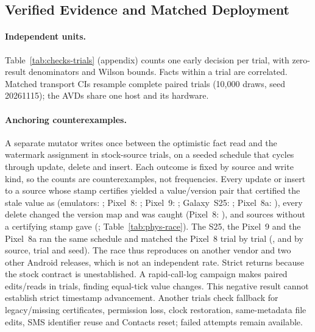 \subsection{Verified Evidence and Matched Deployment}
\label{sec:checks}

\paragraph{Independent units.} Table~\ref{tab:checks-trials} (appendix) counts one early decision per trial, with zero-result denominators and Wilson bounds. Facts within a trial are correlated. Matched transport CIs resample complete paired trials (10,000 draws, seed 20261115); the AVDs share one host and its hardware.

\paragraph{Anchoring counterexamples.} A separate mutator writes once between the optimistic fact read and the watermark assignment in \RevStock stock-source trials, on a seeded schedule that cycles through update, delete and insert. Each outcome is fixed by source and write kind, so the counts are counterexamples, not frequencies. Every update or insert to a source whose stamp certifies yielded a value/version pair that certified the stale value as \Fresh (emulators: \PhysRaceEmuStampedStale; Pixel~8: \PhysRaceStampedStale\ifPhysNine; Pixel~9: \PhysNineRaceStampedStale\fi\ifPhysSamsung; Galaxy~S25: \PhysSamsungRaceStampedStale\fi; Pixel~8a: \PhysEightARaceStampedStale), every delete changed the version map and was caught (Pixel~8: \PhysRaceDeletesCaught), and sources without a certifying stamp gave \Unknown (\PhysRaceStamplessUnknown; Table~\ref{tab:phys-race}).\ifPhysSamsung{} The S25, the Pixel~9 and the Pixel~8a ran the same schedule and matched the Pixel~8 trial by trial (\PhysSamsungRaceSameAsPixel, \PhysNineRaceSameAsPixel and \PhysEightARaceSameAsPixel by source, trial and seed). The race thus reproduces on another vendor and two other Android releases, which is not an independent rate.\fi{} Strict \sys returns \Unknown because the stock contract is unestablished. A rapid-call-log campaign makes \RevTickPairs paired edits/reads in \RevTickTrials trials, finding \RevTickHits equal-tick value changes. This negative result cannot establish strict timestamp advancement. Another \RevSupplement trials check fallback for legacy/missing certificates, permission loss, clock restoration, same-metadata file edits, SMS identifier reuse and Contacts reset; failed attempts remain available.

